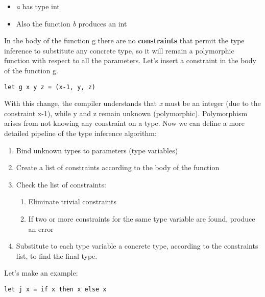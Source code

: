 \begin{itemize}
    \item \textit{a} has type int
    \item Also the function \textit{b} produces an int
\end{itemize}
In the body of the function g there are no \textbf{constraints} that permit the type inference to substitute any concrete type, so it will remain a polymorphic function with respect to all the parameters.\newline\newline
Let's insert a constraint in the body of the function g.
\begin{lstlisting}[style=FSharpStyle]
    let g x y z = (x-1, y, z)
\end{lstlisting}
With this change, the compiler understands that \textit{x} must be an integer (due to the constraint x-1), while y and z remain unknown (polymorphic). Polymorphism arises from not knowing any constraint on a type. \newline\newline
Now we can define a more detailed pipeline of the type inference algorithm:
\begin{enumerate}
    \item Bind unknown types to parameters (type variables)
    \item Create a list of constraints according to the body of the function
    \item Check the list of constraints:
           \begin{enumerate}
               \item Eliminate trivial constraints
               \item If two or more constraints for the same type variable are found, produce an error
           \end{enumerate} 
    \item Substitute to each type variable a concrete type, according to the constraints list, to find the final type.    
\end{enumerate}
Let's make an example:
\begin{lstlisting}[style=FSharpStyle]
    let j x = if x then x else x
\end{lstlisting}
